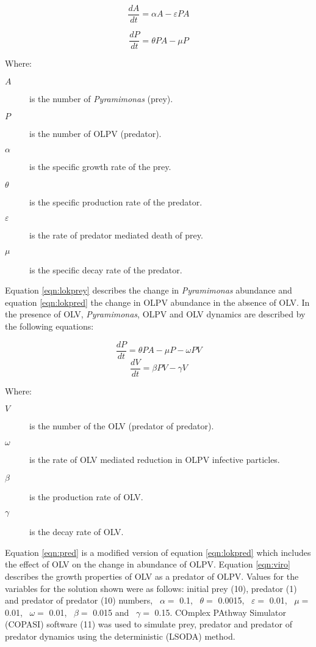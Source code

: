 \begin{equation}
\frac{dA}{dt}=\alpha A - \varepsilon PA
\label{eqn:lokprey}
\end{equation}

\begin{equation}
\frac{dP}{dt}= \theta PA - \mu P
\label{eqn:lokpred}
\end{equation}

Where:
\begin{description}
\item[$A$] is the number of \emph{Pyramimonas} (prey).
\item[$P$] is the number of \ac{OLPV} (predator).
\item[$\alpha$] is the specific growth rate of the prey.
\item[$\theta$] is the specific production rate of the predator.
\item[$\varepsilon$] is the rate of predator mediated death of prey.
\item[$\mu$] is the specific decay rate of the predator.
\end{description}

Equation \ref{eqn:lokprey} describes the change in \emph{Pyramimonas} abundance and equation \ref{eqn:lokpred} the change in \ac{OLPV} abundance in the absence of \ac{OLV}.
In the presence of \ac{OLV}, \emph{Pyramimonas}, \ac{OLPV} and \ac{OLV} dynamics are described by the following equations:

\begin{equation}
\frac{dP}{dt}= \theta PA - \mu P - \omega PV
\label{eqn:pred}
\end{equation}
\begin{equation}
\frac{dV}{dt}=\beta PV - \gamma V
\label{eqn:viro}
\end{equation}

Where:
\begin{description}
\item[$V$] is the number of the \ac{OLV} (predator of predator).
\item[$\omega$] is the rate of \ac{OLV} mediated reduction in OLPV infective particles.
\item[$\beta$] is the production rate of \ac{OLV}.
\item[$\gamma$] is the decay rate of \ac{OLV}.
\end{description}

Equation \ref{eqn:pred} is a modified version of equation \ref{eqn:lokpred} which includes the effect of \ac{OLV} on the change in abundance of \ac{OLPV}.
Equation \ref{eqn:viro} describes the growth properties of \ac{OLV} as a predator of \ac{OLPV}.
Values for the variables for the solution shown  were as follows: initial prey (10), predator (1) and predator of predator (10) numbers, ~$\alpha=$ 0.1, ~$\theta=$ 0.0015, ~$\varepsilon=$ 0.01, ~$\mu=$ 0.01, ~$\omega=$ 0.01, ~$\beta=$ 0.015 and ~$\gamma=$ 0.15. 
COmplex PAthway Simulator (\textsc{COPASI}) software (11) was used to simulate prey, predator and predator of predator dynamics using the deterministic (\textsc{LSODA}) method.


